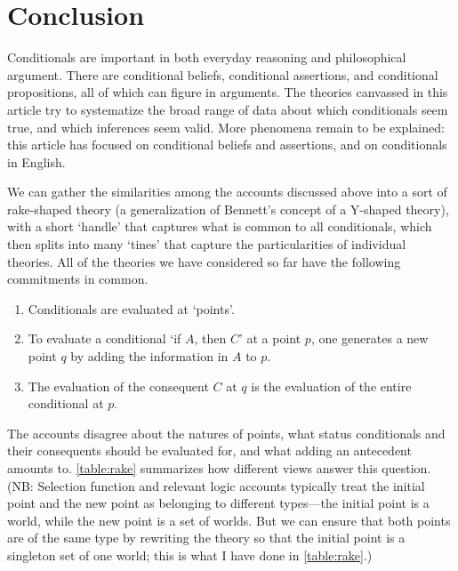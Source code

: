  
\section{Conclusion}

Conditionals are important in both everyday reasoning and philosophical argument.  There are conditional beliefs, conditional assertions, and conditional propositions, all of which can figure in arguments.  The theories canvassed in this article try to systematize the broad range of data about which conditionals seem true, and which inferences seem valid.  More phenomena remain to be explained: this article has focused on conditional beliefs and assertions, and on conditionals in English.

We can gather the similarities among the accounts discussed above into a sort of rake-shaped theory (a generalization of Bennett's concept of a Y-shaped theory), with a short `handle' that captures what is common to all conditionals, which then splits into many `tines' that capture the particularities of individual theories.  All of the theories we have considered so far have the following commitments in common.
\begin{enumerate}
\item Conditionals are evaluated at `points'.

\item To evaluate a conditional `if $A$, then $C$' at a point $p$, one generates a new point $q$ by adding the information in $A$ to $p$.

\item The evaluation of the consequent $C$ at $q$ is the evaluation of the entire conditional at $p$.
\end{enumerate}
The accounts disagree about the natures of points, what status conditionals and their consequents should be evaluated for, and what adding an antecedent amounts to.  \autoref{table:rake} summarizes how different views answer this question. (NB: Selection function and relevant logic accounts typically treat the initial point and the new point as belonging to different types---the initial point is a world, while the new point is a set of worlds. But we can ensure that both points are of the same type by rewriting the theory so that the initial point is a singleton set of one world; this is what I have done in \autoref{table:rake}.)

